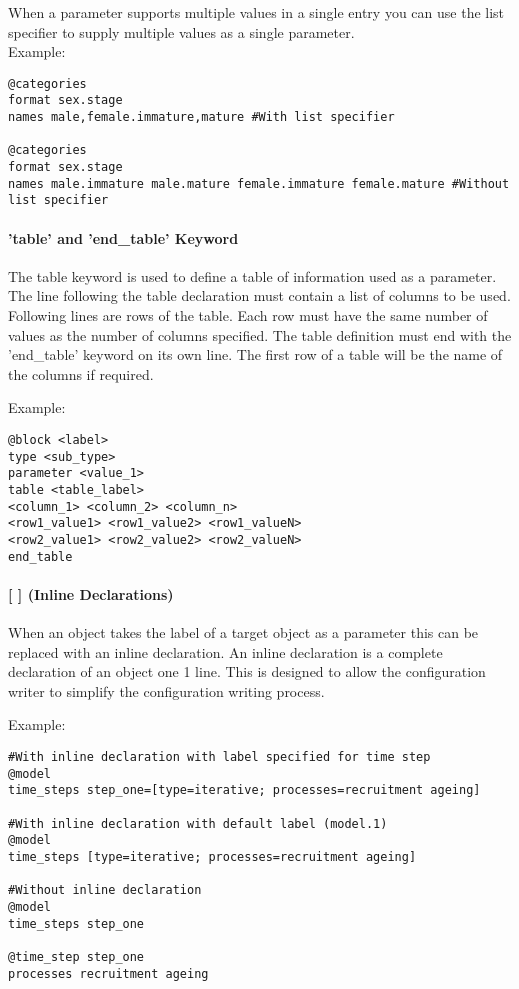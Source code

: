 When a parameter supports multiple values in a single entry you can use the list specifier to supply multiple values as a single parameter.\\

Example:

{\small{\begin{verbatim}
@categories
format sex.stage
names male,female.immature,mature #With list specifier

@categories
format sex.stage
names male.immature male.mature female.immature female.mature #Without list specifier
\end{verbatim}}}

\paragraph*{'table' and 'end\_table' Keyword}

The table keyword is used to define a table of information used as a parameter. The line following the table declaration must contain a list of columns to be used. Following lines are rows of the table. Each row must have the same number of values as the number of columns specified. The table definition must end with the 'end\_table' keyword on its own line. The first row of a table will be the name of the columns if required.

Example:

{\small{\begin{verbatim}
@block <label>
type <sub_type>
parameter <value_1>
table <table_label>
<column_1> <column_2> <column_n>
<row1_value1> <row1_value2> <row1_valueN>
<row2_value1> <row2_value2> <row2_valueN>
end_table
\end{verbatim}}}

\paragraph*{[ ] (Inline Declarations)}

When an object takes the label of a target object as a parameter this can be replaced with an inline declaration. An inline declaration is a complete declaration of an object one 1 line. This is designed to allow the configuration writer to simplify the configuration writing process.

Example:

{\small{\begin{verbatim}
#With inline declaration with label specified for time step
@model
time_steps step_one=[type=iterative; processes=recruitment ageing]

#With inline declaration with default label (model.1)
@model
time_steps [type=iterative; processes=recruitment ageing]

#Without inline declaration
@model
time_steps step_one

@time_step step_one
processes recruitment ageing
\end{verbatim}}}

